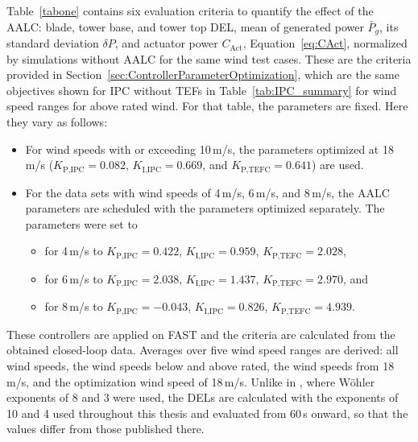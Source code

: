 %
Table~\ref{tabone} contains six evaluation criteria to quantify the effect of the AALC: blade, tower base, and tower top DEL, mean of generated power $\bar{P}_{g}$, its standard deviation $\delta P$, and actuator power $C_{\text{Act}}$, Equation~\eqref{eq:CAct}, normalized by simulations without AALC for the same wind test cases. These are the criteria provided in Section~\ref{sec:ControllerParameterOptimization}, which are the same objectives shown for IPC without TEFs in Table~\ref{tab:IPC_summary} for wind speed ranges for above rated wind. For that table, the parameters are fixed. Here they vary as follows:
\begin{itemize}
    \item For wind speeds with or exceeding 10\,m/s, the parameters optimized at 18\,m/s ($K_{\text{P,IPC}} = 0.082$, $K_{\text{I,IPC}} = 0.669$, and $K_{\text{P,TEFC}} = 0.641$) are used.
    \item For the data sets with wind speeds of 4\,m/s, 6\,m/s, and 8\,m/s, the AALC parameters are scheduled with the parameters optimized separately. The parameters were set to
    \begin{itemize}
        \item for  4\,m/s to $K_{\text{P,IPC}} = 0.422$,  $K_{\text{I,IPC}} = 0.959$,  $K_{\text{P,TEFC}} =  2.028$,
        \item for  6\,m/s to $K_{\text{P,IPC}} =2.038$,  $K_{\text{I,IPC}} = 1.437$,  $K_{\text{P,TEFC}} = 2.970$, and
        \item for  8\,m/s to $K_{\text{P,IPC}} =-0.043$,  $K_{\text{I,IPC}} = 0.826 $,  $K_{\text{P,TEFC}} = 4.939$.
    \end{itemize}
\end{itemize}
These controllers are applied on FAST and the criteria are calculated from the obtained closed-loop data. Averages over five wind speed ranges are derived: all wind speeds, the wind speeds below and above rated, the wind speeds from 18\,m/s, and the optimization wind speed of 18\,m/s. Unlike in \cite{dittmer2024combined}, where W\"ohler exponents of 8 and 3 were used, the DELs are calculated with the exponents of 10 and 4 used throughout this thesis and evaluated from 60\,s onward, so that the values differ from those published there.

